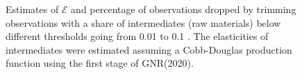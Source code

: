 \documentclass[
  12pt]{article}
\theoremstyle{definition}
\theoremstyle{remark}
\begin{document}
\begin{figure}


\caption{\label{fig-cutoff-drop}Estimates of \(\mathcal{E}\) and
percentage of observations dropped by trimming observations with a share
of intermediates (raw materials) below different thresholds going from
0.01 to 0.1 . The elasticities of intermediates were estimated assuming
a Cobb-Douglas production function using the first stage of GNR(2020).}

\end{figure}%
\end{document}
